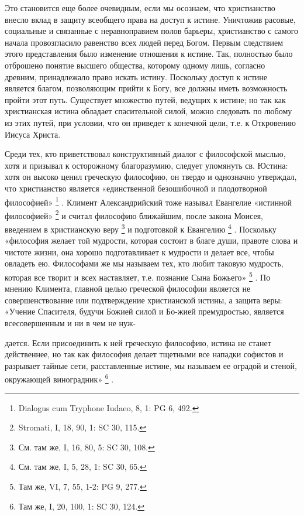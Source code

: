 \documentclass[a5paper,10pt]{article}
\begin{document}
Это становится еще более очевидным, если мы осознаем, что христианство внесло
вклад в защиту всеобщего права на доступ к истине. Уничтожив расовые,
социальные и связанные с неравноправием полов барьеры, христианство с самого
начала провозгласило равенство всех людей перед Богом. Первым следствием этого
представления было изменение отношения к истине. Так, полностью было отброшено
понятие высшего общества, которому одному лишь, согласно древним, принадлежало
право искать истину. Поскольку доступ к истине является благом, позволяющим
прийти к Богу, все должны иметь возможность пройти этот путь. Существует
множество путей, ведущих к истине; но так как христианская истина обладает
спасительной силой, можно следовать по любому из этих путей, при условии, что
он приведет к конечной цели, т.е. к Откровению Иисуса Христа.

Среди тех, кто приветствовал конструктивный диалог с философской мыслью, хотя и
призывал к осторожному благоразумию, следует упомянуть св. Юстина: хотя он
высоко ценил греческую философию, он твердо и однозначно утверждал, что
христианство является «единственной безошибочной и плодотворной философией»
\footnote{Dialogus cum Tryphone Iudaeo, 8, 1: PG 6, 492.}  .  Климент
Александрийский тоже называл Евангелие «истинной философией»
\footnote{Stromati, I, 18, 90, 1: SC 30, 115.}  и считал философию ближайшим,
после закона Моисея, введением в христианскую веру \footnote{См. там же, I, 16,
80, 5: SC 30, 108.}  и подготовкой к Евангелию \footnote{См. там же, I, 5, 28,
1: SC 30, 65.}  . Поскольку «философия желает той мудрости, которая состоит в
благе души, правоте слова и чистоте жизни, она хорошо подготавливает к мудрости
и делает все, чтобы овладеть ею. Философами же мы называем тех, кто любит
таковую мудрость, которая все творит и всех наставляет, т.е. познание Сына
Божьего» \footnote{Там же, VI, 7, 55, 1-2: PG 9, 277.} .  По мнению Климента,
главной целью греческой философии является не совершенствование или
подтверждение христианской истины, а защита веры: «Учение Спасителя, будучи
Божией силой и Бо-жией премудростью, является всесовершенным и ни в чем не нуж-

дается. Если присоединить к ней греческую философию, истина не станет
действеннее, но так как философия делает тщетными все нападки софистов и
разрывает тайные сети, расставленные истине, мы называем ее оградой и стеной,
окружающей виноградник» \footnote{Там же, I, 20, 100, 1: SC 30, 124.} .
\end{document}
